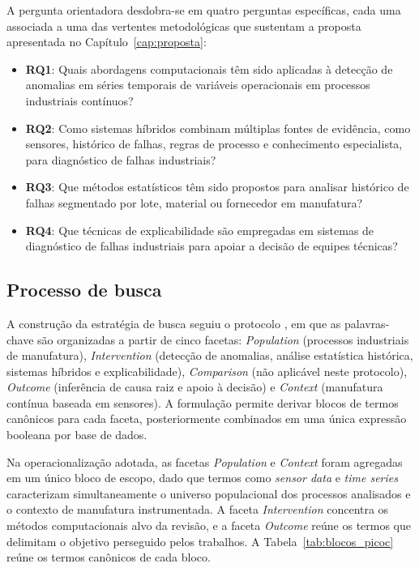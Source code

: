 A pergunta orientadora desdobra-se em quatro perguntas específicas, cada uma associada a uma das vertentes metodológicas que sustentam a proposta apresentada no Capítulo~\ref{cap:proposta}:

\begin{itemize}
    \item \textbf{RQ1}: Quais abordagens computacionais têm sido aplicadas à detecção de anomalias em séries temporais de variáveis operacionais em processos industriais contínuos?
    \item \textbf{RQ2}: Como sistemas híbridos combinam múltiplas fontes de evidência, como sensores, histórico de falhas, regras de processo e conhecimento especialista, para diagnóstico de falhas industriais?
    \item \textbf{RQ3}: Que métodos estatísticos têm sido propostos para analisar histórico de falhas segmentado por lote, material ou fornecedor em manufatura?
    \item \textbf{RQ4}: Que técnicas de explicabilidade são empregadas em sistemas de diagnóstico de falhas industriais para apoiar a decisão de equipes técnicas?
\end{itemize}

\subsection{Processo de busca}
\label{subsec:processo_busca}

A construção da estratégia de busca seguiu o protocolo  \cite{petticrew2006systematic}, em que as palavras-chave são organizadas a partir de cinco facetas: \emph{Population} (processos industriais de manufatura), \emph{Intervention} (detecção de anomalias, análise estatística histórica, sistemas híbridos e explicabilidade), \emph{Comparison} (não aplicável neste protocolo), \emph{Outcome} (inferência de causa raiz e apoio à decisão) e \emph{Context} (manufatura contínua baseada em sensores). A formulação  permite derivar blocos de termos canônicos para cada faceta, posteriormente combinados em uma única expressão booleana por base de dados.

Na operacionalização adotada, as facetas \emph{Population} e \emph{Context} foram agregadas em um único bloco de escopo, dado que termos como \emph{sensor data} e \emph{time series} caracterizam simultaneamente o universo populacional dos processos analisados e o contexto de manufatura instrumentada. A faceta \emph{Intervention} concentra os métodos computacionais alvo da revisão, e a faceta \emph{Outcome} reúne os termos que delimitam o objetivo perseguido pelos trabalhos. A Tabela~\ref{tab:blocos_picoc} reúne os termos canônicos de cada bloco.

